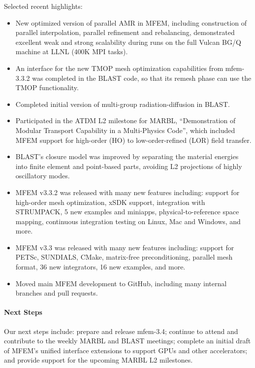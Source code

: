Selected recent highlights:
\begin{itemize}
\item
New optimized version of parallel AMR in MFEM, including construction of parallel interpolation, parallel refinement and rebalancing, demonstrated excellent weak and strong scalability during runs on the full Vulcan BG/Q machine at LLNL (400K MPI tasks).
\item
An interface for the new TMOP mesh optimization capabilities from mfem-3.3.2 was completed in the BLAST code, so that its remesh phase can use the TMOP functionality.
\item
Completed initial version of multi-group radiation-diffusion in BLAST.
\item
Participated in the ATDM L2 milestone for MARBL, ``Demonstration of Modular Transport Capability in a Multi-Physics Code'', which included MFEM support for high-order (HO) to low-order-refined (LOR) field transfer.
\item
BLAST's closure model was improved by separating the material energies into finite element and point-based parts, avoiding L2 projections of highly oscillatory modes.
\item MFEM v3.3.2 was released with many new features including: support for high-order mesh optimization, xSDK support, integration with STRUMPACK, 5 new examples and miniapps, physical-to-reference space mapping, continuous integration testing on Linux, Mac and Windows, and more.
\item MFEM v3.3 was released with many new features including: support for PETSc, SUNDIALS, CMake, matrix-free preconditioning, parallel mesh format, 36 new integrators, 16 new examples, and more.
\item Moved main MFEM development to GitHub, including many internal branches and pull requests.
\end{itemize}

\paragraph{Next Steps}

Our next steps include:
prepare and release mfem-3.4; continue to attend and contribute to the weekly MARBL and BLAST meetings;
complete an initial draft of MFEM's unified interface extensions to support GPUs and other accelerators;
and provide support for the upcoming MARBL L2 milestones.

